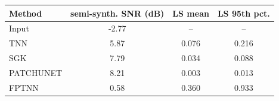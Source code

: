 \begin{tabular}{lccc}
\hline
Method & semi-synth. SNR (dB) & LS mean & LS 95th pct. \\
\hline
Input & -2.77 & -- & -- \\
TNN & 5.87 & 0.076 & 0.216 \\
SGK & 7.79 & 0.034 & 0.088 \\
PATCHUNET & 8.21 & 0.003 & 0.013 \\
FPTNN & 0.58 & 0.360 & 0.933 \\
\hline
\end{tabular}
